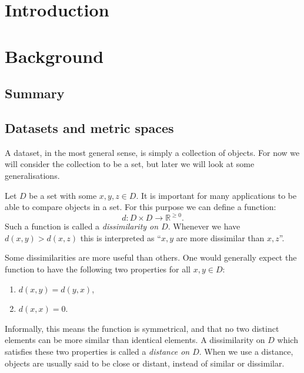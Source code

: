 \documentclass[a4paper]{report}
\title{\reporttitle}
\author{\reportauthor}
\newcommand{\dset}{D}
\begin{document}
\maketitle

\tableofcontents

\chapter{Introduction}
\label{cha:introduction}

\chapter{Background}
\label{cha:background}

\section{Summary}
\label{sec:summary-backgd}


\section{Datasets and metric spaces}
\label{sec:datas-metr-spac}

A dataset, in the most general sense, is simply a collection of objects.  For
now we will consider the collection to be a set, but later we will look at
some generalisations.

Let $\dset$ be a set with some $x,y,z \in \dset$.  It is important for many
applications to be able to compare objects in a set.  For this purpose we can
define a function:
\begin{equation*}
  d \colon \dset \times \dset \to \mathbb{R}^{\geq 0}.
\end{equation*}
Such a function is called a \textit{dissimilarity on $\dset$}.  Whenever we
have $d(x,y)>d(x,z)$ this is interpreted as ``$x,y$ are more dissimilar than
$x,z$''.

Some dissimilarities are more useful than others.  One would generally expect
the function to have the following two properties for all $x,y \in \dset$:
\begin{enumerate}
\item $d(x,y) = d(y,x)$,
\item \label{item:distinct} $d(x,x) = 0$.
\end{enumerate}
Informally, this means the function is symmetrical, and that no two distinct
elements can be more similar than identical elements.  A dissimilarity on
$\dset$ which satisfies these two properties is called a \textit{distance on
  $\dset$}.  When we use a distance, objects are usually said to be close or
distant, instead of similar or dissimilar.
\end{document}
